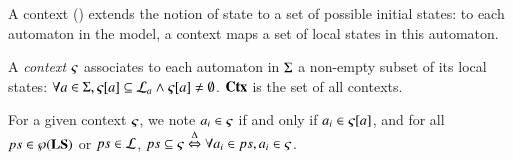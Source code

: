 A context () extends the notion of state to a set of possible initial states:
to each automaton in the model, a context maps a set of local states in this automaton.
\begin{definition}
\label{def:context}
  A \emph{context} $\varsigma$ associates to each automaton in $\Sigma$ a non-empty subset of its local states:
  $\forall a \in \Sigma, {\varsigma[a]} \subseteq \mathcal{L}_a \wedge {\varsigma[a]} \neq \emptyset$.
  $\mathbf{Ctx}$ is the set of all contexts.
\end{definition}
\noindent
For a given context $\varsigma$, we note $a_i \in \varsigma$ if and only if $a_i \in {\varsigma[a]}$,
and for all $ps \in \wp(\mathbf{LS})$ or $ps \in \mathcal{L}$, $ps \subseteq \varsigma \stackrel{\Delta}\Leftrightarrow \forall a_i \in ps, a_i \in \varsigma$.
\begin{comment}
A sequence of actions $\delta$ is \emph{playable} in a context $\ctx$ if and only if 
$\exists s \subseteq \ctx, \delta \in \Sce(s)$.
We denote then: $\delta \in \Sce(\ctx)$,
and the play of $\delta$ in $\ctx$ is $\ctx \PHplay \delta = \ctx \Cap \ceil(\delta)$,
where $\ceil(\delta)$ is the set containing the last local state in the sequence $\delta$ (hitter or bounce) of every automaton mentioned in $\delta$.

\end{comment}

\begin{comment}
We also extend the override operator to contexts (\pref{def:ctxcap}).
\begin{definition}[$\Cap: \Ctx \times \powerset(\PHproc) \rightarrow \Ctx$]
\label{def:ctxcap}
  For any $\ctx\in\Ctx$ and set of local states $ps \in \powerset(\PHproc)$,
  the override of $\ctx$ by $ps$ is noted $\ctx \Cap ps$ and is defined by:
  \[ \forall a \in \PHs, \PHget{(\ctx \Cap ps)}{a} \DEF
  \begin{cases}
    \{ p \in ps \mid \PHsort(p)=a \} & \text{if } \exists p \in ps, \PHsort(p)=a,\\
    \PHget{\ctx}{a} & \text{else.}
  \end{cases}
  \]
\end{definition}
\end{comment}


